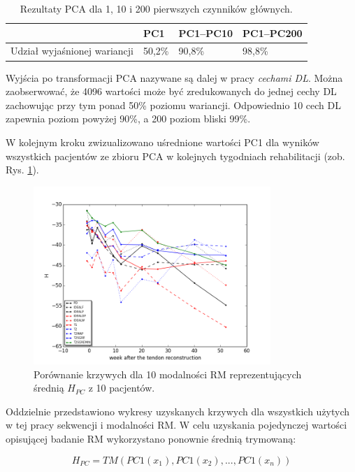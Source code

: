 \renewcommand{\arraystretch}{1.2}
\begin{table}[h!]
 \setlength{\tabcolsep}{12pt}
 \centering
 \caption{Rezultaty PCA dla 1, 10 i 200 pierwszych czynników głównych.}
 \label{PCA-results}
 \begin{tabular}{l|l|l|l}
 
 & PC1 & PC1--PC10 & PC1--PC200 \\ \hline \hline
 Udział wyjaśnionej wariancji & 50,2\% & 90,8\%   & 98,8\% \\ \hline 
 \end{tabular}
 \end{table}
\renewcommand{\arraystretch}{1}
Wyjścia po transformacji PCA nazywane są dalej w pracy \textit{cechami DL}. Można zaobserwować, że 4096 wartości może być zredukowanych do jednej cechy DL zachowując przy tym ponad 50\% poziomu wariancji. Odpowiednio 10 cech DL zapewnia poziom powyżej 90\%, a 200 poziom bliski 99\%. 

W kolejnym kroku zwizualizowano uśrednione wartości PC1 dla wyników wszystkich pacjentów ze zbioru PCA w kolejnych tygodniach rehabilitacji (zob. Rys. \ref{fig:H}).

\begin{figure}[h!]
	\centering
	\includegraphics[width=0.8\textwidth]{figures/H_PC1.png}
	\caption{Porównanie krzywych dla 10 modalności RM reprezentujących średnią $H_{PC}$ z 10 pacjentów.}\label{fig:H}
\end{figure}
Oddzielnie przedstawiono wykresy uzyskanych krzywych dla wszystkich użytych w tej pracy sekwencji i modalności RM. W celu uzyskania pojedynczej wartości opisującej badanie RM wykorzystano ponownie średnią trymowaną:

\begin{equation}
\label{ecq:HPC}
H_{PC} = TM(PC1(x_1), PC1(x_2),..., PC1(x_n))
\end{equation}

